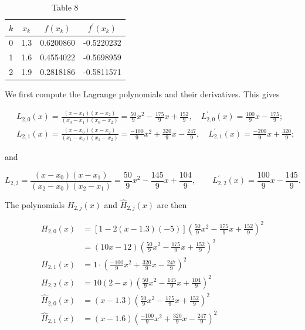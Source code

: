 \begin{table}
\centering
\begin{tabular}{cccc}
\hline
$k$ & $x_{k}$ & $f\left(x_{k}\right)$ & $f^{\prime}\left(x_{k}\right)$ \\
\hline
0 & 1.3 & 0.6200860 & -0.5220232 \\
1 & 1.6 & 0.4554022 & -0.5698959 \\
2 & 1.9 & 0.2818186 & -0.5811571 \\
\hline
\end{tabular}
\caption{\scriptsize Table $8$}
\label{tab:hermiteexample1}
\end{table}

\begin{mysolution}
We first compute the Lagrange polynomials and their derivatives. This gives

$$
\begin{aligned}
& L_{2,0}(x)=\frac{\left(x-x_{1}\right)\left(x-x_{2}\right)}{\left(x_{0}-x_{1}\right)\left(x_{0}-x_{2}\right)}=\frac{50}{9} x^{2}-\frac{175}{9} x+\frac{152}{9}, \quad L_{2,0}^{\prime}(x)=\frac{100}{9} x-\frac{175}{9} ; \\
& L_{2,1}(x)=\frac{\left(x-x_{0}\right)\left(x-x_{2}\right)}{\left(x_{1}-x_{0}\right)\left(x_{1}-x_{2}\right)}=\frac{-100}{9} x^{2}+\frac{320}{9} x-\frac{247}{9}, \quad L_{2,1}^{\prime}(x)=\frac{-200}{9} x+\frac{320}{9} ;
\end{aligned}
$$

and

$$
L_{2,2}=\frac{\left(x-x_{0}\right)\left(x-x_{1}\right)}{\left(x_{2}-x_{0}\right)\left(x_{2}-x_{1}\right)}=\frac{50}{9} x^{2}-\frac{145}{9} x+\frac{104}{9}, \quad \quad L_{2,2}^{\prime}(x)=\frac{100}{9} x-\frac{145}{9} .
$$

The polynomials $H_{2, j}(x)$ and $\hat{H}_{2, j}(x)$ are then

$$
\begin{aligned}
H_{2,0}(x) & =[1-2(x-1.3)(-5)]\left(\frac{50}{9} x^{2}-\frac{175}{9} x+\frac{152}{9}\right)^{2} \\
& =(10 x-12)\left(\frac{50}{9} x^{2}-\frac{175}{9} x+\frac{152}{9}\right)^{2} \\
H_{2,1}(x) & =1 \cdot\left(\frac{-100}{9} x^{2}+\frac{320}{9} x-\frac{247}{9}\right)^{2} \\
H_{2,2}(x) & =10(2-x)\left(\frac{50}{9} x^{2}-\frac{145}{9} x+\frac{104}{9}\right)^{2} \\
\hat{H}_{2,0}(x) & =(x-1.3)\left(\frac{50}{9} x^{2}-\frac{175}{9} x+\frac{152}{9}\right)^{2} \\
\hat{H}_{2,1}(x) & =(x-1.6)\left(\frac{-100}{9} x^{2}+\frac{320}{9} x-\frac{247}{9}\right)^{2}
\end{aligned}
$$


\end{mysolution}
